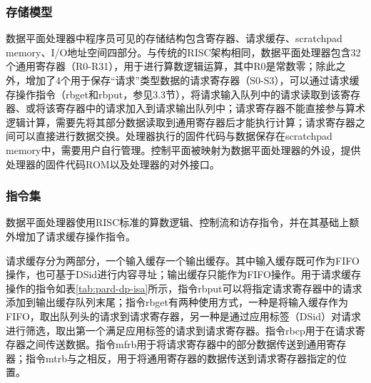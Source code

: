 \subsubsection{存储模型}
数据平面处理器中程序员可见的存储结构包含寄存器、请求缓存、scratchpad memory、I/O地址空间四部分。与传统的RISC架构相同，数据平面处理器包含32个通用寄存器（R0-R31），用于进行算数逻辑运算，其中R0是常数零；除此之外，增加了4个用于保存``请求''类型数据的请求寄存器（S0-S3），可以通过请求缓存操作指令（rbget和rbput，参见3.3节），将请求输入队列中的请求读取到该寄存器、或将该寄存器中的请求加入到请求输出队列中；请求寄存器不能直接参与算术逻辑计算，需要先将其部分数据读取到通用寄存器后才能执行计算；请求寄存器之间可以直接进行数据交换。处理器执行的固件代码与数据保存在scratchpad memory中，需要用户自行管理。控制平面被映射为数据平面处理器的外设，提供处理器的固件代码ROM以及处理器的对外接口。

\subsubsection{指令集}
数据平面处理器使用RISC标准的算数逻辑、控制流和访存指令，并在其基础上额外增加了请求缓存操作指令。

请求缓存分为两部分，一个输入缓存一个输出缓存。其中输入缓存既可作为FIFO操作，也可基于DSid进行内容寻址；输出缓存只能作为FIFO操作。用于请求缓存操作的指令如表\ref{tab:pard-dp-isa}所示，指令rbput可以将指定请求寄存器中的请求添加到输出缓存队列末尾；指令rbget有两种使用方式，一种是将输入缓存作为FIFO，取出队列头的请求到请求寄存器，另一种是通过应用标签（DSid）对请求进行筛选，取出第一个满足应用标签的请求到请求寄存器。指令rbcp用于在请求寄存器之间传送数据。指令mfrb用于将请求寄存器中的部分数据传送到通用寄存器；指令mtrb与之相反，用于将通用寄存器的数据传送到请求寄存器指定的位置。

